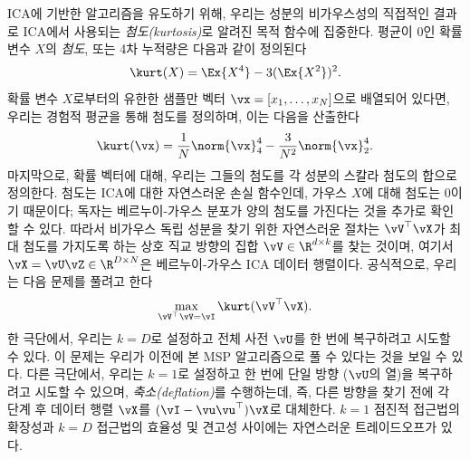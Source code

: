 \documentclass[../../book-main_ko.tex]{subfiles}
\begin{document}
ICA에 기반한 알고리즘을 유도하기 위해, 우리는 성분의 비가우스성의 직접적인 결과로 ICA에서 사용되는 \textit{첨도(kurtosis)}로 알려진 목적 함수에 집중한다. 평균이 0인 확률 변수 \(X\)의 \textit{첨도}, 또는 4차 누적량은 다음과 같이 정의된다
\begin{equation}\label{eq:kurtosis}
\kurt(X) = \Ex{X^4} - 3 (\Ex{X^2})^2.
\end{equation}
확률 변수 \(X\)로부터의 유한한 샘플만 벡터 \(\vx = [x_1, \dots, x_N]\)으로 배열되어 있다면, 우리는 경험적 평균을 통해 첨도를 정의하며, 이는 다음을 산출한다
\begin{equation}\label{eq:kurtosis-vector}
\kurt(\vx) = \frac{1}{N} \norm{\vx}_4^4 - \frac{3}{N^2} \norm{\vx}_2^4.
\end{equation}
마지막으로, 확률 벡터에 대해, 우리는 그들의 첨도를 각 성분의 스칼라 첨도의 합으로 정의한다.
첨도는 ICA에 대한 자연스러운 손실 함수인데, 가우스 \(X\)에 대해 첨도는 0이기 때문이다; 독자는 베르누이-가우스 분포가 양의 첨도를 가진다는 것을 추가로 확인할 수 있다.
따라서 비가우스 독립 성분을 찾기 위한 자연스러운 절차는 \(\vV^\top \vX\)가 최대 첨도를 가지도록 하는 상호 직교 방향의 집합 \(\vV \in \R^{d \times k}\)를 찾는 것이며, 여기서 \(\vX = \vU \vZ \in \R^{D \times N}\)은 베르누이-가우스 ICA 데이터 행렬이다.
공식적으로, 우리는 다음 문제를 풀려고 한다
\begin{equation}
    \max_{\vV^\top \vV = \vI} \kurt(\vV^\top \vX).
\end{equation}
한 극단에서, 우리는 \(k = D\)로 설정하고 전체 사전 \(\vU\)를 한 번에 복구하려고 시도할 수 있다. 이 문제는 우리가 이전에 본 MSP 알고리즘으로 풀 수 있다는 것을 보일 수 있다.
다른 극단에서, 우리는 \(k=1\)로 설정하고 한 번에 단일 방향 (\(\vU\)의 열)을 복구하려고 시도할 수 있으며, \textit{축소(deflation)}를 수행하는데, 즉, 다른 방향을 찾기 전에 각 단계 후 데이터 행렬 \(\vX\)를 \((\vI - \vu\vu^\top) \vX\)로 대체한다.
\(k=1\) 점진적 접근법의 확장성과 \(k=D\) 접근법의 효율성 및 견고성 사이에는 자연스러운 트레이드오프가 있다.
\end{document}
